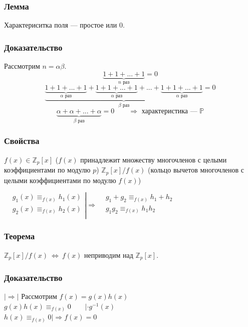 \documentclass[12pt]{article}
\begin{document}
\subsubsection{Лемма}
Характериситка поля — простое или $0$.
\subsubsection{Доказательство}
Рассмотрим $n = \alpha \beta$.
\[
    \underbrace{1 + 1 + ... + 1}_{n \text{ раз}} = 0
\]
\[
    \underbrace{\underbrace{1 + 1 + ... + 1}_{\alpha \text{ раз}} + \underbrace{1 + 1 + ... + 1}_{\alpha \text{ раз}} + ... + \underbrace{1 + 1 + ... + 1}_{\alpha \text{ раз}}}_{\beta \text{ раз}} = 0
\]
\[
    \underbrace{\alpha + \alpha + ... + \alpha}_{\beta \text{ раз}} = 0 \qquad \Rightarrow \text{ характеристика — } \mathbb{P}
\]
\subsubsection{Свойства}
$f(x) \in \mathbb{Z}_p[x]$ ($f(x)$ принадлежит множеству многочленов с целыми коэффициентами по модулю $p$)  $\mathbb{Z}_p[x] / f(x)$ (кольцо вычетов многочленов с целыми коэффициентами по модулю $f(x)$)

$
    \displaystyle
    \left.\begin{aligned}
         & g_1(x) \equiv_{f(x)} h_1(x) \\
         & g_2(x) \equiv_{f(x)} h_2(x) \\
    \end{aligned}\right| \Rightarrow \begin{aligned}
         & g_1 + g_2 \equiv_{f(x)} h_1 + h_2 \\
         & g_1g_2 \equiv_{f(x)} h_1h_2       \\
    \end{aligned}
$
\subsubsection{Теорема}
$\mathbb{Z}_p[x] / f(x)\ \Leftrightarrow\ f(x)$ неприводим над $\mathbb{Z}_p[x]$.

\subsubsection{Доказательство}
$|\Rightarrow|$ Рассмотрим $f(x) = g(x)h(x)$ \\
$g(x)h(x) \equiv_{f(x)} 0 \qquad | \cdot g^{-1}(x) $ \\
$h(x) \equiv_{f(x)} 0 |\Rightarrow f(x) = 0$
\end{document}
